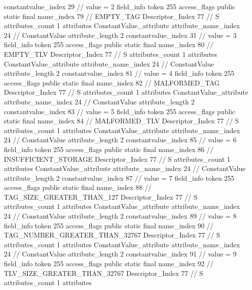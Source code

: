 {{{{{{{					constantvalue_index	29		// value = 2
				}
				}
			}
			field_info {
				token	255
				access_flags	public static final
				name_index	79		// EMPTY_TAG
				Descriptor_Index	77		// S
				attributes_count	1
				attributes {
				ConstantValue_attribute {
					attribute_name_index	24		// ConstantValue
					attribute_length	2
					constantvalue_index	31		// value = 3
				}
				}
			}
			field_info {
				token	255
				access_flags	public static final
				name_index	80		// EMPTY_TLV
				Descriptor_Index	77		// S
				attributes_count	1
				attributes {
				ConstantValue_attribute {
					attribute_name_index	24		// ConstantValue
					attribute_length	2
					constantvalue_index	81		// value = 4
				}
				}
			}
			field_info {
				token	255
				access_flags	public static final
				name_index	82		// MALFORMED_TAG
				Descriptor_Index	77		// S
				attributes_count	1
				attributes {
				ConstantValue_attribute {
					attribute_name_index	24		// ConstantValue
					attribute_length	2
					constantvalue_index	83		// value = 5
				}
				}
			}
			field_info {
				token	255
				access_flags	public static final
				name_index	84		// MALFORMED_TLV
				Descriptor_Index	77		// S
				attributes_count	1
				attributes {
				ConstantValue_attribute {
					attribute_name_index	24		// ConstantValue
					attribute_length	2
					constantvalue_index	85		// value = 6
				}
				}
			}
			field_info {
				token	255
				access_flags	public static final
				name_index	86		// INSUFFICIENT_STORAGE
				Descriptor_Index	77		// S
				attributes_count	1
				attributes {
				ConstantValue_attribute {
					attribute_name_index	24		// ConstantValue
					attribute_length	2
					constantvalue_index	87		// value = 7
				}
				}
			}
			field_info {
				token	255
				access_flags	public static final
				name_index	88		// TAG_SIZE_GREATER_THAN_127
				Descriptor_Index	77		// S
				attributes_count	1
				attributes {
				ConstantValue_attribute {
					attribute_name_index	24		// ConstantValue
					attribute_length	2
					constantvalue_index	89		// value = 8
				}
				}
			}
			field_info {
				token	255
				access_flags	public static final
				name_index	90		// TAG_NUMBER_GREATER_THAN_32767
				Descriptor_Index	77		// S
				attributes_count	1
				attributes {
				ConstantValue_attribute {
					attribute_name_index	24		// ConstantValue
					attribute_length	2
					constantvalue_index	91		// value = 9
				}
				}
			}
			field_info {
				token	255
				access_flags	public static final
				name_index	92		// TLV_SIZE_GREATER_THAN_32767
				Descriptor_Index	77		// S
				attributes_count	1
				attributes {
}}}}}}
